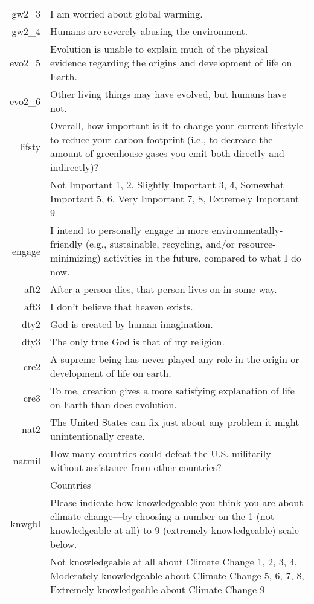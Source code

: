 \begin{longtabu}{>{\sffamily}rX}
gw2_3 & I am worried about global warming. \\

gw2_4 & Humans are severely abusing the environment. \\

evo2_5 & Evolution is unable to explain much of the physical evidence regarding the origins and development of life on Earth. \\

evo2_6 & Other living things may have evolved, but humans have not. \\

lifsty & Overall, how important is it to change your current lifestyle to reduce your carbon footprint (i.e., to decrease the amount of greenhouse gases you emit both directly and indirectly)? \\
 & Not Important 1, 2, Slightly Important 3, 4, Somewhat Important 5, 6, Very Important 7, 8, Extremely Important 9 \\

engage & I intend to personally engage in more environmentally-friendly (e.g., sustainable, recycling, and/or resource-minimizing) activities in the future, compared to what I do now. \\

aft2 & After a person dies, that person lives on in some way. \\

aft3 & I don't believe that heaven exists. \\

dty2 & God is created by human imagination. \\

dty3 & The only true God is that of my religion. \\

cre2 & A supreme being has never played any role in the origin or development of life on earth. \\

cre3 & To me, creation gives a more satisfying explanation of life on Earth than does evolution. \\

nat2 & The United States can fix just about any problem it might unintentionally create. \\

natmil & How many countries could defeat the U.S. militarily without assistance from other countries? \\
 & \underline{\hspace{3cm}} Countries \\

knwgbl & Please indicate how knowledgeable you think you are about climate
change—by choosing a number on the 1 (not knowledgeable at all) to 9 (extremely
knowledgeable) scale below. \\
 & Not knowledgeable at all about Climate Change 1, 2, 3, 4, Moderately
 knowledgeable about Climate Change 5, 6, 7, 8, Extremely knowledgeable about
 Climate Change 9 \\
\end{longtabu}
